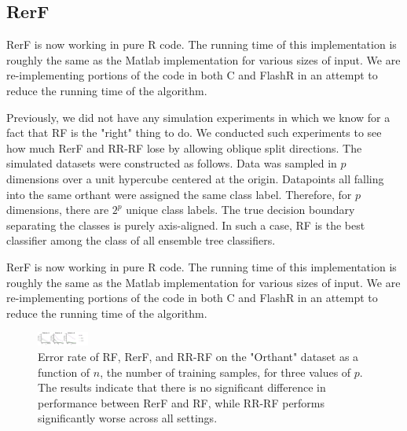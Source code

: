 \documentclass[simplex.tex]{subfiles}
\begin{document}
\subsection{RerF}

RerF is now working in pure R code.  The running time of this
implementation is roughly the same as the Matlab implementation for
various sizes of input.  We are re-implementing portions of the code in
both C and FlashR in an attempt to reduce the running time of the
algorithm.

Previously, we did not have any simulation experiments in which we know for a fact that RF is the "right" thing to do. We conducted such experiments to see how much RerF and RR-RF lose by allowing oblique split directions. The simulated datasets were constructed as follows. Data was sampled in $p$ dimensions over a unit hypercube centered at the origin. Datapoints all falling into the same orthant were assigned the same class label. Therefore, for $p$ dimensions, there are $2^p$ unique class labels. The true decision boundary separating the classes is purely axis-aligned. In such a case, RF is the best classifier among the class of all ensemble tree classifiers.

RerF is now working in pure R code.  The running time of this implementation is roughly the same as the Matlab implementation for various sizes of input.  We are re-implementing portions of the code in both C and FlashR in an attempt to reduce the running time of the algorithm.

\begin{figure}[!h]
\begin{cframed}
\centering
\includegraphics[width=0.15\textwidth]{../../figs/RerF.pdf}
\caption{Error rate of RF, RerF, and RR-RF on the "Orthant" dataset as a function of $n$, the number of training samples, for three values of $p$. The results indicate that there is no significant difference in performance between RerF and RF, while RR-RF performs significantly worse across all settings.}
\label{fig:name}
\end{cframed}
\end{figure}
\clearpage
\end{document}
